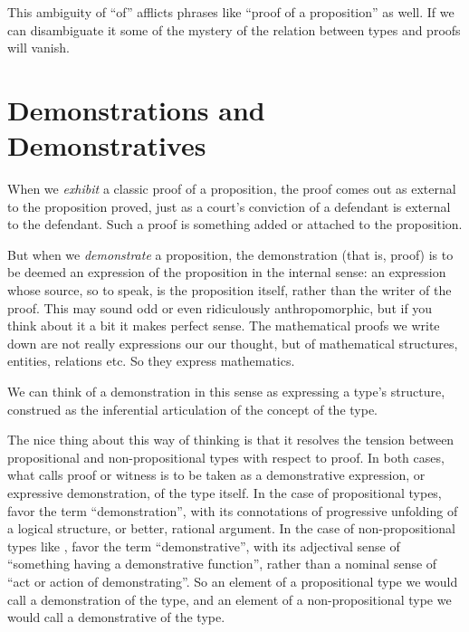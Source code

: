 This ambiguity of ``of'' afflicts phrases like ``proof of a
proposition'' as well.  If we can disambiguate it some of the mystery
of the relation between types and proofs will vanish.

\section{Demonstrations and Demonstratives}
\label{subs:}

When we \textit{exhibit} a classic proof of a proposition, the proof
comes out as external to the proposition proved, just as a court's
conviction of a defendant is external to the defendant.  Such a proof
is something added or attached to the proposition.

But when we \textit{demonstrate} a proposition, the demonstration (that is, proof)
is to be deemed an expression of the proposition in the internal
sense: an expression whose source, so to speak, is the proposition
itself, rather than the writer of the proof.  This may sound odd or
even ridiculously anthropomorphic, but if you think about it a bit it
makes perfect sense.  The mathematical proofs we write down are not
really expressions our our thought, but of mathematical structures,
entities, relations etc.  So they express
mathematics.

We can think of a demonstration in this sense as expressing a type's
structure, construed as the inferential articulation of the concept of
the type.

The nice thing about this way of thinking is that it resolves the
tension between propositional and non-propositional types with respect
to proof.  In both cases, what \HoTT{} calls proof or witness is to be
taken as a demonstrative expression, or expressive demonstration, of
the type itself.  In the case of propositional types, favor the term
``demonstration'', with its connotations of progressive unfolding of a
logical structure, or better, rational argument.  In the case of
non-propositional types like \N, favor the term ``demonstrative'',
with its adjectival sense of ``something having a demonstrative
function'', rather than a nominal sense of ``act or action of
demonstrating''.  So an element
of a propositional type we would call a demonstration of the type, and
an element of a non-propositional type we would call a demonstrative
of the type.

